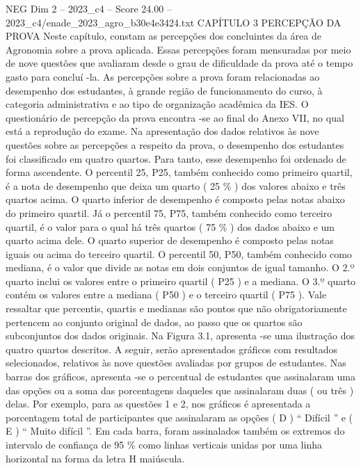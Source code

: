 \begin{textsample}{NEG Dim 2 – 2023\_c4 – Score 24.00 – 2023\_c4/enade\_2023\_agro\_b30e4e3424.txt}  \label{ex:f2_neg_423}
CAPÍTULO 3 PERCEPÇÃO DA PROVA Neste capítulo, constam as percepções dos concluintes da área de Agronomia sobre a prova aplicada.
Essas percepções foram mensuradas por meio de nove questões que avaliaram desde o grau de dificuldade da prova até o tempo gasto para concluí -la.
As percepções sobre a prova foram relacionadas ao desempenho dos estudantes, à grande região de funcionamento do curso, à categoria administrativa e ao tipo de organização acadêmica da IES.
O questionário de percepção da prova encontra -se ao final do Anexo VII, no qual está a reprodução do exame.
Na apresentação dos dados relativos às nove questões sobre as percepções a respeito da prova, o desempenho dos estudantes foi classificado em quatro quartos.
Para tanto, esse desempenho foi ordenado de forma ascendente.
O percentil 25, P25, também conhecido como primeiro quartil, é a nota de desempenho que deixa um quarto ( 25 \% ) dos valores abaixo e três quartos acima.
O quarto inferior de desempenho é composto pelas notas abaixo do primeiro quartil.
Já o percentil 75, P75, também conhecido como terceiro quartil, é o valor para o qual há três quartos ( 75 \% ) dos dados abaixo e um quarto acima dele.
O quarto superior de desempenho é composto pelas notas iguais ou acima do terceiro quartil.
O percentil 50, P50, também conhecido como mediana, é o valor que divide as notas em dois conjuntos de igual tamanho.
O 2.º quarto inclui os valores entre o primeiro quartil ( P25 ) e a mediana.
O 3.º quarto contém os valores entre a mediana ( P50 ) e o terceiro quartil ( P75 ).
Vale ressaltar que percentis, quartis e medianas são pontos que não obrigatoriamente pertencem ao conjunto original de dados, ao passo que os quartos são subconjuntos dos dados originais.
Na Figura 3.1, apresenta -se uma ilustração dos quatro quartos descritos.
A seguir, serão apresentados gráficos com resultados selecionados, relativos às nove questões avaliadas por grupos de estudantes.
Nas barras dos gráficos, apresenta -se o percentual de estudantes que assinalaram uma das opções ou a soma das porcentagens daqueles que assinalaram duas ( ou três ) delas.
Por exemplo, para as questões 1 e 2, nos gráficos é apresentada a porcentagem total de participantes que assinalaram as opções ( D ) “ Difícil ” e ( E ) “ Muito difícil ”.
Em cada barra, foram assinalados também os extremos do intervalo de confiança de 95 \% como linhas verticais unidas por uma linha horizontal na forma da letra H maiúscula.

\end{textsample}
